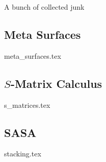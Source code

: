 A bunch of collected junk
\subsection{Meta Surfaces} \label{sec:MS}
{meta_surfaces.tex}
\newpage

\subsection{$S$-Matrix Calculus}
{s_matrices.tex}
\newpage

\subsection{SASA}
{stacking.tex}
\newpage
